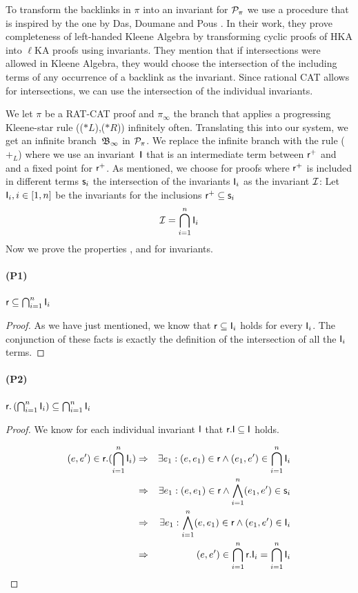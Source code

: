 \documentclass[a4paper,twoside,12pt, english]{article}
\begin{document}
\noindent To transform the backlinks in $\pi$ into an invariant for $\mathcal{P}_\pi$ we use a procedure that is inspired by the one by Das, Doumane and Pous \cite{Das+18}. In their work, they prove completeness of left-handed Kleene Algebra by transforming cyclic proofs of HKA \cite{DasPou17} into $\ell$KA proofs using invariants.
They mention that if intersections were allowed in Kleene Algebra, they would choose the intersection of the including terms of any occurrence of a backlink as the invariant. Since rational CAT allows for intersections, we can use the intersection of the individual invariants.

We let $\pi$ be a RAT-CAT proof and $\pi_\infty$ the branch that applies a progressing Kleene-star rule (($*L$),($*R$)) infinitely often. Translating this into our system, we get an infinite branch~$\mathfrak{B}_\infty$ in $\mathcal{P}_\pi$. We replace the infinite branch with the rule ($+_L$) where we use an invariant~$\textsf{\upshape I}$ that is an intermediate term between $\textsf{\upshape r}^+$ and \Rels{} and a fixed point for $\textsf{\upshape r}^+$. 
As mentioned, we choose for proofs where $\textsf{\upshape r}^+$ is included in different terms $\textsf{\upshape s}_i$ the intersection of the invariants $\textsf{\upshape I}_i$ as the invariant $\mathcal{I}$:
Let $\textsf{\upshape I}_i, i \in [1,n]$ be the invariants for the inclusions $\textsf{\upshape r}^+ \subseteq \textsf{\upshape s}_i$
\[\mathcal{I} = \bigcap_{i=1}^n \textsf{\upshape I}_i\]
\newpage
\noindent Now we prove the properties \propl, \propz{} and \prope{} for invariants.

\paragraph{(P1)} $\textsf{\upshape r} \subseteq \bigcap_{i = 1}^n \textsf{\upshape I}_i $
\begin{proof}As we have just mentioned, we know that $\textsf{\upshape r} \subseteq \textsf{\upshape I}_i$ holds for every $\textsf{\upshape I}_i$. The conjunction of these facts is exactly the definition of the intersection of all the $\textsf{\upshape I}_i$ terms. \end{proof}

\paragraph{(P2)} $\textsf{\upshape r}.\left( \bigcap_{i = 1}^n \textsf{\upshape I}_i \right) \subseteq \bigcap_{i = 1}^n \textsf{\upshape I}_i$
\begin{proof}
We know for each individual invariant $\textsf{\upshape I}$ that $\textsf{\upshape r}.\textsf{\upshape I} \subseteq \textsf{\upshape I}$ holds.

\begin{eqnarray*}
(e,e') \in  \textsf{\upshape r}.(\bigcap_{i = 1}^n \textsf{\upshape I}_i) &\Rightarrow & \exists e_1: (e,e_1) \in \textsf{\upshape r} \land (e_1,e') \in \bigcap_{i = 1}^n \textsf{\upshape I}_i \\
& \Rightarrow & \exists e_1: (e,e_1)\in \textsf{\upshape r} \land \bigwedge_{i=1}^n (e_1,e') \in \textsf{\upshape s}_i \\
&\Rightarrow & \exists e_1: \bigwedge_{i=1}^n (e,e_1) \in \textsf{\upshape r} \land (e_1,e') \in \textsf{\upshape I}_i \\
&\Rightarrow & (e,e') \in  \bigcap_{i = 1}^n \textsf{\upshape r}.\textsf{\upshape I}_i = \bigcap_{i = 1}^n \textsf{\upshape I}_i
\end{eqnarray*}
\end{proof}
\end{document}
